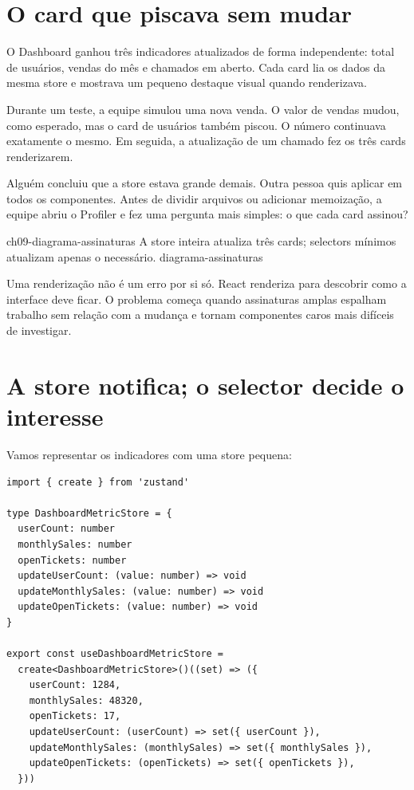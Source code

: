 \label{chap:selectors-performance}

\section{O card que piscava sem mudar}

\begin{historia}
O Dashboard ganhou três indicadores atualizados de forma independente: total de
usuários, vendas do mês e chamados em aberto. Cada card lia os dados da mesma
store e mostrava um pequeno destaque visual quando renderizava.

Durante um teste, a equipe simulou uma nova venda. O valor de vendas mudou, como
esperado, mas o card de usuários também piscou. O número continuava exatamente
o mesmo. Em seguida, a atualização de um chamado fez os três cards renderizarem.

Alguém concluiu que a store estava grande demais. Outra pessoa quis aplicar
 em todos os componentes. Antes de dividir arquivos ou adicionar
memoização, a equipe abriu o Profiler e fez uma pergunta mais simples: o que
cada card assinou?
\end{historia}

\imagemcapitulo
  {ch09-diagrama-assinaturas}
  {A store inteira atualiza três cards; selectors mínimos atualizam apenas o necessário.}
  {diagrama-assinaturas}

Uma renderização não é um erro por si só. React renderiza para descobrir como a
interface deve ficar. O problema começa quando assinaturas amplas espalham
trabalho sem relação com a mudança e tornam componentes caros mais difíceis de
investigar.

\section{A store notifica; o selector decide o interesse}

Vamos representar os indicadores com uma store pequena:

\begin{lstlisting}[caption={Indicadores atualizados de forma independente.},label={lst:metric-store}]
import { create } from 'zustand'

type DashboardMetricStore = {
  userCount: number
  monthlySales: number
  openTickets: number
  updateUserCount: (value: number) => void
  updateMonthlySales: (value: number) => void
  updateOpenTickets: (value: number) => void
}

export const useDashboardMetricStore =
  create<DashboardMetricStore>()((set) => ({
    userCount: 1284,
    monthlySales: 48320,
    openTickets: 17,
    updateUserCount: (userCount) => set({ userCount }),
    updateMonthlySales: (monthlySales) => set({ monthlySales }),
    updateOpenTickets: (openTickets) => set({ openTickets }),
  }))
\end{lstlisting}

